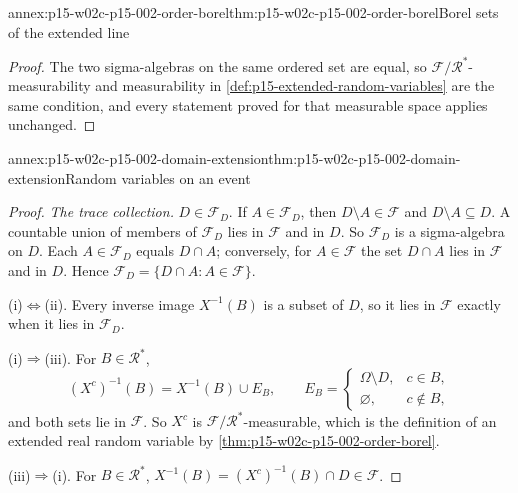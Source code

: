 \begin{annexitem}{annex:p15-w02c-p15-002-order-borel}{thm:p15-w02c-p15-002-order-borel}{Borel sets of the extended line}
\begin{proof}
The two sigma-algebras on the same ordered set are equal, so
\(\mathcal F/\mathcal R^*\)-measurability and measurability in
\cref{def:p15-extended-random-variables} are the same condition, and
every statement proved for that measurable space applies unchanged.
\end{proof}
\end{annexitem}

\begin{annexitem}{annex:p15-w02c-p15-002-domain-extension}{thm:p15-w02c-p15-002-domain-extension}{Random variables on an event}
\begin{proof}
\emph{The trace collection.} \(D\in\mathcal F_D\). If \(A\in\mathcal F_D\),
then \(D\setminus A\in\mathcal F\) and \(D\setminus A\subseteq D\). A
countable union of members of \(\mathcal F_D\) lies in \(\mathcal F\) and
in \(D\). So \(\mathcal F_D\) is a sigma-algebra on \(D\). Each
\(A\in\mathcal F_D\) equals \(D\cap A\); conversely, for \(A\in\mathcal F\)
the set \(D\cap A\) lies in \(\mathcal F\) and in \(D\). Hence
\(\mathcal F_D=\{D\cap A:A\in\mathcal F\}\).

(i)\(\Leftrightarrow\)(ii). Every inverse image \(X^{-1}(B)\) is a subset
of \(D\), so it lies in \(\mathcal F\) exactly when it lies in
\(\mathcal F_D\).

(i)\(\Rightarrow\)(iii). For \(B\in\mathcal R^*\),
\[
 (X^c)^{-1}(B)=X^{-1}(B)\cup E_B,\qquad
 E_B=\begin{cases}\Omega\setminus D,&c\in B,\\ \varnothing,&c\notin B,\end{cases}
\]
and both sets lie in \(\mathcal F\). So \(X^c\) is
\(\mathcal F/\mathcal R^*\)-measurable, which is the definition of an
extended real random variable by \cref{thm:p15-w02c-p15-002-order-borel}.

(iii)\(\Rightarrow\)(i). For \(B\in\mathcal R^*\),
\(X^{-1}(B)=(X^c)^{-1}(B)\cap D\in\mathcal F\).
\end{proof}
\end{annexitem}

